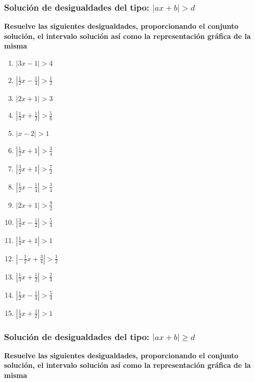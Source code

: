 \documentclass[12pt]{article}
\begin{document}
{\subsubsection{Solución de desigualdades del tipo: \(|ax+b| >d\)}
\textbf{Resuelve las siguientes desigualdades, proporcionando el conjunto solución, el intervalo solución así como la representación gráfica de la misma}

\begin{enumerate}
\def\labelenumi{\arabic{enumi}.}
\item
  \(|3x-1|>4\)
\item
  \(|\frac{1}{2}x-\frac{1}{4}|>\frac{1}{2}\)
\item
  \(|2x+1|>3\)
\item
  \(|\frac{1}{3}x+\frac{1}{2}|>\frac{5}{6}\)
\item
  \(|x-2|>1\)
\item
  \(|\frac{1}{2}x+1|>\frac{3}{4}\)
\item
  \(|\frac{3}{2}x+1|>\frac{7}{2}\)
\item
  \(|\frac{1}{2}x-\frac{1}{4}|>\frac{3}{4}\)
\item
  \(|2x+1|>\frac{9}{2}\)
\item
  \(|\frac{3}{4}x-\frac{1}{2}|>\frac{5}{4}\)
\item
  \(|\frac{1}{4}x+1|>1\)
\item
  \(|-\frac{1}{2}x+\frac{3}{4}|>\frac{1}{2}\)
\item
  \(|\frac{1}{3}x+\frac{1}{2}|>\frac{2}{3}\)
\item
  \(|\frac{1}{2}x-\frac{1}{4}|>\frac{5}{4}\)
\item
  \(|\frac{1}{4}x+\frac{1}{2}|>1\)
\end{enumerate}

\subsubsection{Solución de desigualdades del tipo: \(|ax+b| \geq d\)}

\textbf{Resuelve las siguientes desigualdades, proporcionando el conjunto solución, el intervalo solución así como la representación gráfica de la misma}

}
\end{document}
